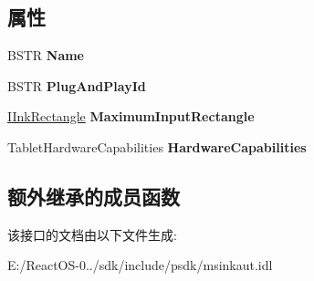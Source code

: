 \subsection*{属性}
\begin{DoxyCompactItemize}
\item 
\mbox{\label{interface_m_s_i_n_k_a_u_t_lib_1_1_i_ink_tablet_af5f161b731a6a1efd507a7cd7b6667ec}} 
B\+S\+TR {\bfseries Name}
\item 
\mbox{\label{interface_m_s_i_n_k_a_u_t_lib_1_1_i_ink_tablet_a2e0581e5d8dd54a2bd31c794d7b320be}} 
B\+S\+TR {\bfseries Plug\+And\+Play\+Id}
\item 
\mbox{\label{interface_m_s_i_n_k_a_u_t_lib_1_1_i_ink_tablet_a8d083f1deadf1d591a49631138be2b9f}} 
\hyperlink{interface_m_s_i_n_k_a_u_t_lib_1_1_i_ink_rectangle}{I\+Ink\+Rectangle} {\bfseries Maximum\+Input\+Rectangle}
\item 
\mbox{\label{interface_m_s_i_n_k_a_u_t_lib_1_1_i_ink_tablet_a37441cda64c9b5e41f429d069ae9282c}} 
Tablet\+Hardware\+Capabilities {\bfseries Hardware\+Capabilities}
\end{DoxyCompactItemize}
\subsection*{额外继承的成员函数}


该接口的文档由以下文件生成\+:\begin{DoxyCompactItemize}
\item 
E\+:/\+React\+O\+S-\/0../sdk/include/psdk/msinkaut.\+idl\end{DoxyCompactItemize}
